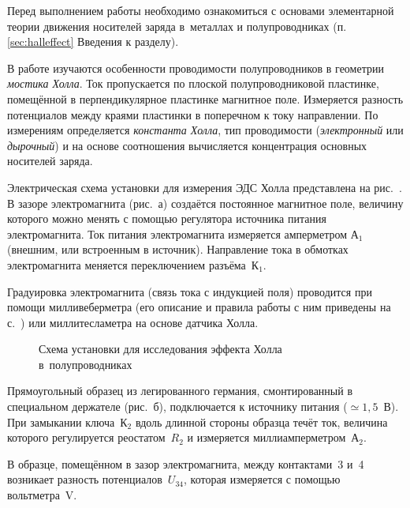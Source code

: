 


Перед выполнением работы необходимо ознакомиться с основами
элементарной теории движения носителей заряда в~металлах и полупроводниках
(п. \ref{sec:halleffect} Введения к разделу).

В работе изучаются особенности проводимости полупроводников
в геометрии \emph{мостика Холла}.
Ток пропускается по плоской полупроводниковой пластинке, 
помещённой в перпендикулярное пластинке магнитное поле.
Измеряется разность потенциалов между краями пластинки в поперечном
к току направлении. По измерениям определяется \emph{константа Холла},
тип проводимости (\emph{электронный} или \emph{дырочный}) и на основе
соотношения  вычисляется концентрация основных
носителей заряда.

\experiment
Электрическая схема установки для измерения ЭДС Холла представлена
на рис.~. В зазоре электромагнита (рис.~а) 
создаётся постоянное магнитное поле, величину которого можно менять с помощью 
регулятора источника питания электромагнита. Ток питания электромагнита 
измеряется амперметром А$_1$ (внешним, или встроенным в источник).
Направление тока в обмотках электромагнита меняется переключением
разъёма~К$_1$.

Градуировка электромагнита (связь тока с индукцией поля) проводится 
при помощи милливеберметра (его описание и правила работы 
с ним приведены на с.~\pageref{MWB}) или миллитесламетра на основе
датчика Холла.

\begin{figure}[h]
    \centering
	\caption{Схема установки для исследования эффекта Холла в~полупроводниках}
\end{figure}

Прямоугольный образец из легированного германия, смонтированный в специальном держателе
(рис.~б), подключается к источнику питания ($\simeq 1,5$~В). При
замыкании ключа~К$_2$ вдоль длинной стороны образца течёт ток, величина которого
регулируется реостатом~$R_2$ и измеряется миллиамперметром~А$_2$.

В образце, помещённом в зазор электромагнита, между 
контактами~3 и~4 возникает разность потенциалов~$U_{34}$, 
которая измеряется с помощью вольтметра~V.

